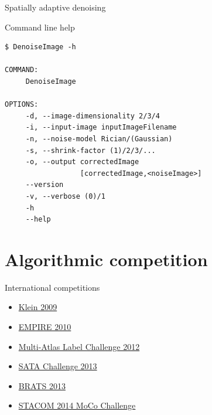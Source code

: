 \documentclass[ignorenonframetext,]{beamer}
\begin{document}
\begin{frame}{Spatially adaptive denoising}

\end{frame}

\begin{frame}[fragile]{Command line help}

\begin{verbatim}
$ DenoiseImage -h

COMMAND:
     DenoiseImage

OPTIONS:
     -d, --image-dimensionality 2/3/4
     -i, --input-image inputImageFilename
     -n, --noise-model Rician/(Gaussian)
     -s, --shrink-factor (1)/2/3/...
     -o, --output correctedImage
                  [correctedImage,<noiseImage>]
     --version
     -v, --verbose (0)/1
     -h
     --help
\end{verbatim}

\end{frame}

\section{Algorithmic competition}\label{algorithmic-competition}

\begin{frame}{International competitions}

\begin{itemize}
\itemsep1pt\parskip0pt
\item
  \href{http://www.ncbi.nlm.nih.gov/pubmed/19195496}{Klein 2009}
\item
  \href{http://empire10.isi.uu.nl}{EMPIRE 2010}
\item
  \href{https://masi.vuse.vanderbilt.edu/workshop2012/index.php/Main_Page}{Multi-Atlas
  Label Challenge 2012}
\item
  \href{https://masi.vuse.vanderbilt.edu/workshop2013/index.php/MICCAI_2013_SATA_Challenge_and_Workshop:Current_events}{SATA
  Challenge 2013}
\item
  \href{http://martinos.org/qtim/miccai2013/}{BRATS 2013}
\item
  \href{http://www.cardiacatlas.org/web/stacom2014/moco-introduction}{STACOM
  2014 MoCo Challenge}
\end{itemize}

\end{frame}
\end{document}
